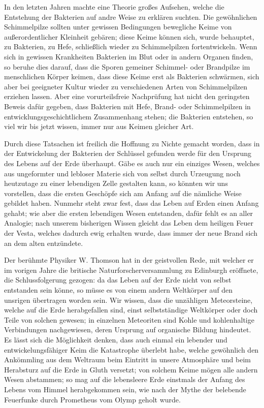\documentclass[a4paper, 11pt, oneside, english]{article}
\begin{document}
In den letzten Jahren machte eine Theorie großes Aufsehen, welche die Entstehung der Bakterien auf andre Weise zu erklären suchten. Die gewöhnlichen Schimmelpilze sollten unter gewissen Bedingungen bewegliche Keime von außerordentlicher Kleinheit gebären; diese Keime können sich, wurde behauptet, zu Bakterien, zu Hefe, schließlich wieder zu Schimmelpilzen fortentwickeln. Wenn sich in gewissen Krankheiten Bakterien im Blut oder in andern Organen finden, so beruhe dies darauf, dass die Sporen gemeiner Schimmel- oder Brandpilze im menschlichen Körper keimen, dass diese Keime erst als Bakterien schwärmen, sich aber bei geeigneter Kultur wieder zu verschiedenen Arten von Schimmelpilzen erziehen lassen. Aber eine vorurteilsfreie Nachprüfung hat nicht den geringsten Beweis dafür gegeben, dass Bakterien mit Hefe, Brand- oder Schimmelpilzen in entwicklungsgeschichtlichem Zusammenhang stehen; die Bakterien entstehen, so viel wir bis jetzt wissen, immer nur aus Keimen gleicher Art.

Durch diese Tatsachen ist freilich die Hoffnung zu Nichte gemacht worden, dass in der Entwickelung der Bakterien der Schlüssel gefunden werde für den Ursprung des Lebens auf der Erde überhaupt. Gäbe es auch nur ein einziges Wesen, welches aus ungeformter und lebloser Materie sich von selbst durch Urzeugung noch heutzutage zu einer lebendigen Zelle gestalten kann, so könnten wir uns vorstellen, dass die ersten Geschöpfe sich am Anfang auf die nämliche Weise gebildet haben. Nunmehr steht zwar fest, dass das Leben auf Erden einen Anfang gehabt; wie aber die ersten lebendigen Wesen entstanden, dafür fehlt es an aller Analogie; nach unserem bisherigen Wissen gleicht das Leben dem heiligen Feuer der Vesta, welches dadurch ewig erhalten wurde, dass immer der neue Brand sich an dem alten entzündete.

Der berühmte Physiker W. Thomson hat in der geistvollen Rede, mit welcher er im vorigen Jahre die britische Naturforscherversammlung zu Edinburgh eröffnete, die Schlussfolgerung gezogen: da das Leben auf der Erde nicht von selbst entstanden sein könne, so müsse es von einem andern Weltkörper auf den unsrigen übertragen worden sein. Wir wissen, dass die unzähligen Meteorsteine, welche auf die Erde herabgefallen sind, einst selbstständige Weltkörper oder doch Teile von solchen gewesen; in einzelnen Meteoriten sind Kohle und kohlenhaltige Verbindungen nachgewiesen, deren Ursprung auf organische Bildung hindeutet. Es lässt sich die Möglichkeit denken, dass auch einmal ein lebender und entwickelungsfähiger Keim die Katastrophe überlebt habe, welche gewöhnlich den Ankömmling aus dem Weltraum beim Eintritt in unsere Atmosphäre und beim Herabsturz auf die Erde in Gluth versetzt; von solchem Keime mögen alle andern Wesen abstammen; so mag auf die lebensleere Erde einstmals der Anfang des Lebens vom Himmel herabgekommen sein, wie nach der Mythe der belebende Feuerfunke durch Prometheus vom Olymp geholt wurde.
\end{document}
